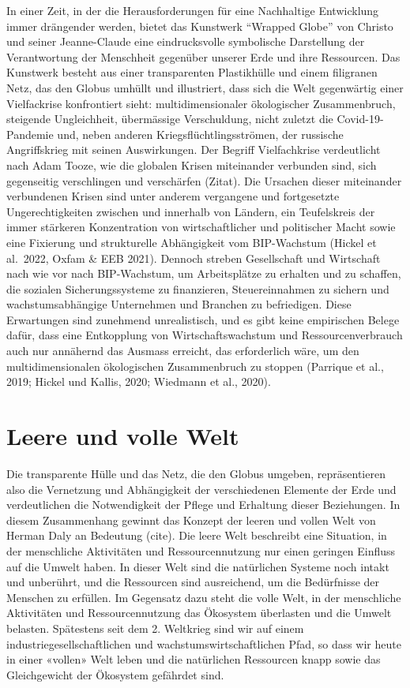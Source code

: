 \documentclass[
]{book}
\begin{document}
In einer Zeit, in der die Herausforderungen für eine Nachhaltige Entwicklung immer drängender werden, bietet das Kunstwerk ``Wrapped Globe'' von Christo und seiner Jeanne-Claude eine eindrucksvolle symbolische Darstellung der Verantwortung der Menschheit gegenüber unserer Erde und ihre Ressourcen. Das Kunstwerk besteht aus einer transparenten Plastikhülle und einem filigranen Netz, das den Globus umhüllt und illustriert, dass sich die Welt gegenwärtig einer Vielfackrise konfrontiert sieht: multidimensionaler ökologischer Zusammenbruch, steigende Ungleichheit, übermässige Verschuldung, nicht zuletzt die Covid-19-Pandemie und, neben anderen Kriegsflüchtlingsströmen, der russische Angriffskrieg mit seinen Auswirkungen. Der Begriff Vielfachkrise verdeutlicht nach Adam Tooze, wie die globalen Krisen miteinander verbunden sind, sich gegenseitig verschlingen und verschärfen (Zitat). Die Ursachen dieser miteinander verbundenen Krisen sind unter anderem vergangene und fortgesetzte Ungerechtigkeiten zwischen und innerhalb von Ländern, ein Teufelskreis der immer stärkeren Konzentration von wirtschaftlicher und politischer Macht sowie eine Fixierung und strukturelle Abhängigkeit vom BIP-Wachstum (Hickel et al.~2022, Oxfam \& EEB 2021). Dennoch streben Gesellschaft und Wirtschaft nach wie vor nach BIP-Wachstum, um Arbeitsplätze zu erhalten und zu schaffen, die sozialen Sicherungssysteme zu finanzieren, Steuereinnahmen zu sichern und wachstumsabhängige Unternehmen und Branchen zu befriedigen. Diese Erwartungen sind zunehmend unrealistisch, und es gibt keine empirischen Belege dafür, dass eine Entkopplung von Wirtschaftswachstum und Ressourcenverbrauch auch nur annähernd das Ausmass erreicht, das erforderlich wäre, um den multidimensionalen ökologischen Zusammenbruch zu stoppen (Parrique et al., 2019; Hickel und Kallis, 2020; Wiedmann et al., 2020).

\hypertarget{leere-und-volle-welt}{%
\section{Leere und volle Welt}\label{leere-und-volle-welt}}

Die transparente Hülle und das Netz, die den Globus umgeben, repräsentieren also die Vernetzung und Abhängigkeit der verschiedenen Elemente der Erde und verdeutlichen die Notwendigkeit der Pflege und Erhaltung dieser Beziehungen. In diesem Zusammenhang gewinnt das Konzept der leeren und vollen Welt von Herman Daly an Bedeutung (cite). Die leere Welt beschreibt eine Situation, in der menschliche Aktivitäten und Ressourcennutzung nur einen geringen Einfluss auf die Umwelt haben. In dieser Welt sind die natürlichen Systeme noch intakt und unberührt, und die Ressourcen sind ausreichend, um die Bedürfnisse der Menschen zu erfüllen. Im Gegensatz dazu steht die volle Welt, in der menschliche Aktivitäten und Ressourcennutzung das Ökosystem überlasten und die Umwelt belasten. Spätestens seit dem 2. Weltkrieg sind wir auf einem industriegesellschaftlichen und wachstumswirtschaftlichen Pfad, so dass wir heute in einer «vollen» Welt leben und die natürlichen Ressourcen knapp sowie das Gleichgewicht der Ökosystem gefährdet sind.
\end{document}
